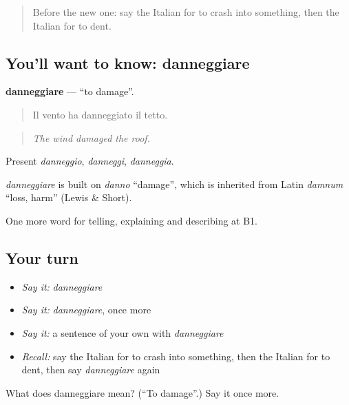 \label{lesson:IT-C299-danneggiare}



\begin{quote}
Before the new one: say the Italian for to crash into something, then the Italian for to dent.
\end{quote}

\subsection*{You'll want to know: danneggiare}
\textbf{danneggiare} — \textquotedblleft{}to damage\textquotedblright{}.

\begin{quote}
Il vento ha danneggiato il tetto.
\end{quote}

\begin{quote}
\emph{The wind damaged the roof.}
\end{quote}

Present \emph{danneggio}, \emph{danneggi}, \emph{danneggia}.

\begin{cousinweb}
\emph{danneggiare} is built on \emph{danno} \textquotedblleft{}damage\textquotedblright{}, which is inherited from Latin \emph{damnum} \textquotedblleft{}loss, harm\textquotedblright{} (Lewis \& Short).
\end{cousinweb}

\begin{grammarlens}[title={What you've built}]
One more word for telling, explaining and describing at B1.
\end{grammarlens}

\subsection*{Your turn}
\begin{itemize}
\raggedright
  \item \emph{Say it:} \emph{danneggiare}
  \item \emph{Say it:} \emph{danneggiare}, once more
  \item \emph{Say it:} a sentence of your own with \emph{danneggiare}
  \item \emph{Recall:} say the Italian for to crash into something, then the Italian for to dent, then say \emph{danneggiare} again
\end{itemize}

\begin{tcolorbox}[breakable,colback=teal!4,colframe=teal!35!black,title={Before you move on}]
What does danneggiare mean? (\textquotedblleft{}To damage\textquotedblright{}.) Say it once more.
\end{tcolorbox}
